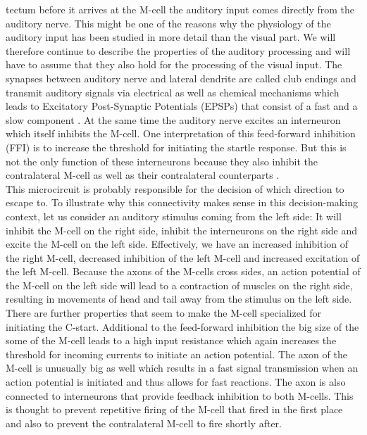 \documentclass[a4paper,10pt,hidelinks]{scrreprt}
\begin{document}
	tectum before it arrives at the M-cell the auditory input comes directly from the auditory 
	nerve.
	This might be one of the reasons why the physiology of the auditory input has been studied in 
	more detail than the visual part.
	We will therefore continue to describe the properties of the auditory processing and will have 
	to assume that they also hold for the processing of the visual input.
	The synapses between auditory nerve and lateral dendrite are called club endings and transmit 
	auditory signals via electrical as well as chemical mechanisms which leads to Excitatory 
	Post-Synaptic Potentials (EPSPs) that consist of a fast and a slow component \citep{Korn2005}.
	At the same time the auditory nerve excites an interneuron which itself inhibits the M-cell.
	One interpretation of this feed-forward inhibition (FFI) is to increase the threshold for 
	initiating the startle response.
	But this is not the only function of these interneurons because they also inhibit the 
	contralateral M-cell as well as their contralateral counterparts \citep{Koyama2016}.\\
	This microcircuit is probably responsible for the decision of which direction to escape to.
	To illustrate why this connectivity makes sense in this decision-making context, let us 
	consider an auditory stimulus coming from the left side:
	It will inhibit the M-cell on the right side, inhibit the interneurons on the right side and 
	excite the M-cell on the left side.
	Effectively, we have an increased inhibition of the right M-cell, decreased inhibition of the 
	left M-cell and increased excitation of the left M-cell.
	Because the axons of the M-cells cross sides, an action potential of the M-cell on the left 
	side will lead to a contraction of muscles on the right side, resulting in movements of head 
	and tail away from the stimulus on the left side.\\
	There are further properties that seem to make the M-cell specialized for initiating the 
	C-start.
	Additional to the feed-forward inhibition the big size of the some of the M-cell leads to a 
	high input resistance which again increases the threshold for incoming currents to initiate an 
	action potential.
	The axon of the M-cell is unusually big as well which results in a fast signal transmission 
	when an action potential is initiated and thus allows for fast reactions.
	The axon is also connected to interneurons that provide feedback inhibition to both M-cells.
	This is thought to prevent repetitive firing of the M-cell that fired in the first place and 
	also to prevent the contralateral M-cell to fire shortly after.
\end{document}
